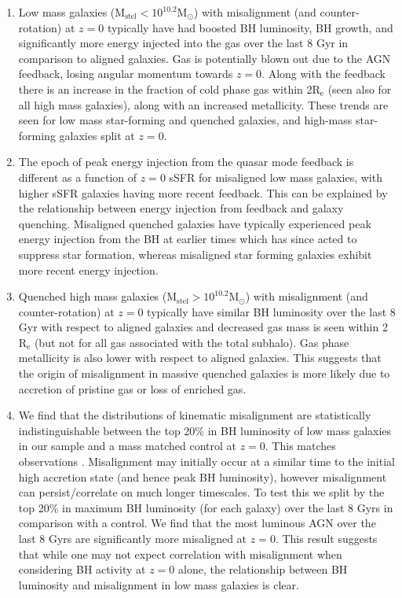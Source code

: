 \begin{enumerate}
    \item Low mass galaxies ($\mathrm{M_{stel} < 10^{10.2}M_{\odot}}$) with misalignment (and counter-rotation) at $z=0$ typically have had boosted BH luminosity, BH growth, and significantly more energy injected into the gas over the last 8 Gyr in comparison to aligned galaxies. Gas is potentially blown out due to the AGN feedback, losing angular momentum towards $z=0$. Along with the feedback there is an increase in the fraction of cold phase gas within 2$\mathrm{R_{e}}$ (seen also for all high mass galaxies), along with an increased metallicity. These trends are seen for low mass star-forming and quenched galaxies, and high-mass star-forming galaxies split at $z=0$.
    
    \item The epoch of peak energy injection from the quasar mode feedback is different as a function of $z=0$ sSFR for misaligned low mass galaxies, with higher sSFR galaxies having more recent feedback. This can be explained by the relationship between energy injection from feedback and galaxy quenching. Misaligned quenched galaxies have typically experienced peak energy injection from the BH at earlier times which has since acted to suppress star formation, whereas misaligned star forming galaxies exhibit more recent energy injection.

    \item Quenched high mass galaxies ($\mathrm{M_{stel} > 10^{10.2}M_{\odot}}$) with misalignment (and counter-rotation) at $z=0$ typically have similar BH luminosity over the last 8 Gyr with respect to aligned galaxies and decreased gas mass is  seen within 2$\mathrm{R_{e}}$ (but not for all gas associated with the total subhalo). Gas phase metallicity is also lower with respect to aligned galaxies. This suggests that the origin of misalignment in massive quenched galaxies is more likely due to accretion of pristine gas or loss of enriched gas. 
    
    \item We find that the distributions of kinematic misalignment are statistically indistinguishable between the top 20\% in BH luminosity of low mass galaxies in our sample and a mass matched control at $z=0$. This matches observations \citep[see Figure 6 in][]{ilha2019}. Misalignment may initially occur at a similar time to the initial high accretion state (and hence peak BH luminosity), however misalignment can persist/correlate on much longer timescales. To test this we split by the top 20\% in maximum BH luminosity (for each galaxy) over the last 8 Gyrs in comparison with a control. We find that the most luminous AGN over the last 8 Gyrs are significantly more misaligned at $z=0$. This result suggests that while one may not expect correlation with misalignment when considering BH activity at $z=0$ alone, the relationship between BH luminosity and misalignment in low mass galaxies is clear. 
\end{enumerate}
